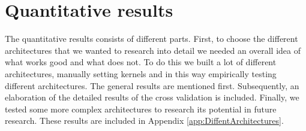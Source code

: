 \documentclass[a4paper,onecolumn]{report}
\begin{document}
\section{Quantitative results}
\label{sec:QuantitativeResults}
The quantitative results consists of different parts. First, to choose the different architectures that we wanted to research into detail we needed an overall idea of what works good and what does not. To do this we built a lot of different architectures, manually setting kernels and in this way empirically testing different architectures. The general results are mentioned first. Subsequently, an elaboration of the detailed results of the cross validation is included. Finally, we tested some more complex architectures to research its potential in future research. These results are included in Appendix \ref{app:DiffentArchitectures}.
\end{document}
